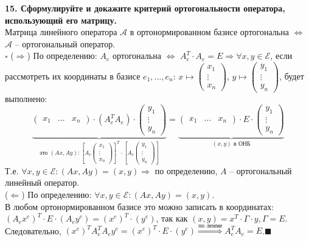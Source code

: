\documentclass[11pt,a4paper]{article}
\newcommand{\A}{\mathcal{A}}
\newcommand{\E}{\mathcal{E}}
\newcommand{\proof}{$\square$ }
\newcommand{\qed}{\hfill$\blacksquare$}
\begin{document}
\textbf{15. Сформулируйте и докажите критерий ортогональности оператора, использующий его матрицу.\\}
Матрица линейного оператора $\A$ в ортонормированном базисе ортогональна $\Leftrightarrow$ $\A$ -- ортогональный оператор.\\
\proof ($\Rightarrow$) По определению: $A_e$ ортогональна $\Leftrightarrow$ $A_e^T \cdot A_e = E \Rightarrow \forall x, y \in \E$, если рассмотреть их координаты в базисе $e_1, \hdots, e_n$: $x \mapsto \left( \begin{matrix}
x_1 \\
\vdots \\
x_n
\end{matrix} \right)$,
$y \mapsto \left( \begin{matrix}
y_1 \\
\vdots \\
y_n
\end{matrix} \right)$, 
будет выполнено:
$$\underbrace{\left( \begin{matrix} x_1 & \hdots & x_n \end{matrix} \right) \cdot \left( A_e^T A_e \right) \cdot \left( \begin{matrix}
y_1 \\
\vdots \\
y_n
\end{matrix} \right)}_{\text{это } (Ax, Ay): \left[ A_e \left( \begin{matrix} x_1 \\ \vdots \\ x_n \end{matrix} \right) \right]^T \cdot \left[ A_e \left( \begin{matrix} y_1 \\ \vdots \\ y_n \end{matrix} \right) \right] } = 
\underbrace{\left( \begin{matrix} x_1 & \hdots & x_n \end{matrix} \right) \cdot E \cdot \left( \begin{matrix}
y_1 \\
\vdots \\
y_n
\end{matrix} \right)}_{(x, y) \text{ в ОНБ}}$$
Т.е. $\forall x, y \in \E: (Ax, Ay) = (x, y) \Rightarrow$ по определению, $A$ -- ортогональный линейный оператор.\\
($\Leftarrow$) По определению: $\forall x, y \in \E: (Ax, Ay) = (x, y)$.\\
В любом ортонормированном базисе это можно записать в координатах:\\
$(A_e x^e)^T \cdot E \cdot (A_e y^e) = (x^e)^T \cdot (y^e)$, так как $(x, y) = x^T \cdot \Gamma \cdot y, \Gamma = E$.\\
Следовательно, $(x^e)^T A_e^T A_e y^e = (x^e)^T \cdot E \cdot (y^e) \stackrel{\text{по лемме}}{\Rightarrow} A_e^T A_e = E$.\qed
\end{document}
